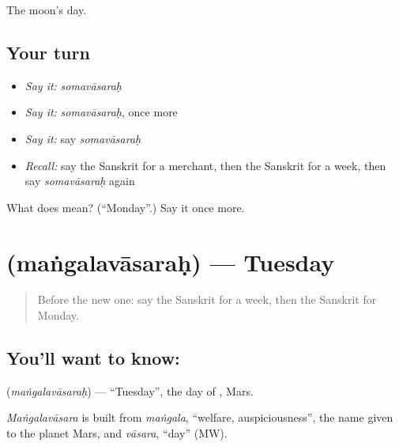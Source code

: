 \begin{grammarlens}[title={What you've built}]
The moon's day.
\end{grammarlens}

\subsection*{Your turn}
\begin{itemize}
\raggedright
  \item \emph{Say it:} \emph{somavāsaraḥ}
  \item \emph{Say it:} \emph{somavāsaraḥ}, once more
  \item \emph{Say it:} say \emph{somavāsaraḥ}
  \item \emph{Recall:} say the Sanskrit for a merchant, then the Sanskrit for a week, then say \emph{somavāsaraḥ} again
\end{itemize}

\begin{tcolorbox}[breakable,colback=teal!4,colframe=teal!35!black,title={Before you move on}]
What does  mean? (\textquotedblleft{}Monday\textquotedblright{}.) Say it once more.
\end{tcolorbox}
\section[\texorpdfstring{\sk{मंगलवासरः} (maṅgalavāsaraḥ)}{मंगलवासरः (maṅgalavāsaraḥ)}]{ (maṅgalavāsaraḥ) — Tuesday}

\label{lesson:SA-C85-tuesday}



\begin{quote}
Before the new one: say the Sanskrit for a week, then the Sanskrit for Monday.
\end{quote}

\subsection*{You'll want to know: }
\textbf{} (\emph{maṅgalavāsaraḥ}) — \textquotedblleft{}Tuesday\textquotedblright{}, the day of \textbf{}, Mars.

\begin{cousinweb}
\emph{Maṅgalavāsara} is built from \emph{maṅgala}, \textquotedblleft{}welfare, auspiciousness\textquotedblright{}, the name given to the planet Mars, and \emph{vāsara}, \textquotedblleft{}day\textquotedblright{} (MW).
\end{cousinweb}

